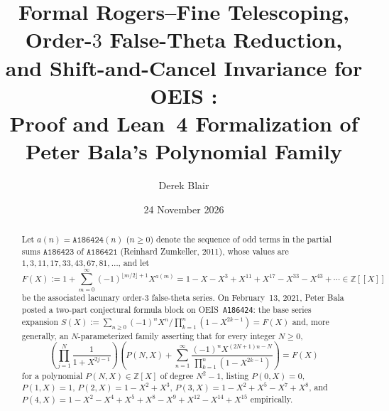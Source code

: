 \documentclass[11pt]{article}
\title{Formal Rogers--Fine Telescoping, Order-$3$ False-Theta Reduction,\\
and Shift-and-Cancel Invariance for OEIS \seq{A186424}:\\[2pt]
\large Proof and Lean~4 Formalization of Peter Bala's Polynomial Family}
\author{Derek Blair}
\date{24 November 2026}
\newcommand{\llbracket}{[\![}
\newcommand{\rrbracket}{]\!]}
\theoremstyle{definition}
\newcommand{\Z}{\mathbb{Z}}
\newcommand{\seq}[1]{\texttt{#1}}
\begin{document}
\maketitle

\begin{abstract}
Let $a(n) = \seq{A186424}(n)$ ($n \ge 0$) denote the sequence of odd terms in the partial sums $\seq{A186423}$ of $\seq{A186421}$ (Reinhard Zumkeller, 2011), whose values are $1, 3, 11, 17, 33, 43, 67, 81, \dots$, and let
\[
F(X) := 1 + \sum_{m=0}^{\infty} (-1)^{\lfloor m/2 \rfloor + 1} X^{a(m)}
= 1 - X - X^3 + X^{11} + X^{17} - X^{33} - X^{43} + \cdots \in \Z\llbracket X \rrbracket
\]
be the associated lacunary order-$3$ false-theta series. On February~13, 2021, Peter Bala posted a two-part conjectural formula block on OEIS~\seq{A186424}: the base series expansion $S(X) := \sum_{n \ge 0} (-1)^n X^n / \prod_{k=1}^n (1 - X^{2k-1}) = F(X)$ and, more generally, an $N$-parameterized family asserting that for every integer $N \ge 0$,
\[
\left(\prod_{j=1}^{N} \frac{1}{1 + X^{2j-1}}\right)\!\left(P(N, X) + \sum_{n=1}^{\infty} \frac{(-1)^n X^{(2N+1)n - N}}{\prod_{k=1}^n (1 - X^{2k-1})}\right) = F(X)
\]
for a polynomial $P(N, X) \in \Z[X]$ of degree $N^2 - 1$, listing $P(0, X) = 0$, $P(1, X) = 1$, $P(2, X) = 1 - X^2 + X^3$, $P(3, X) = 1 - X^2 + X^5 - X^7 + X^8$, and $P(4, X) = 1 - X^2 - X^4 + X^5 + X^8 - X^9 + X^{12} - X^{14} + X^{15}$ empirically.


\end{abstract}
\end{document}
